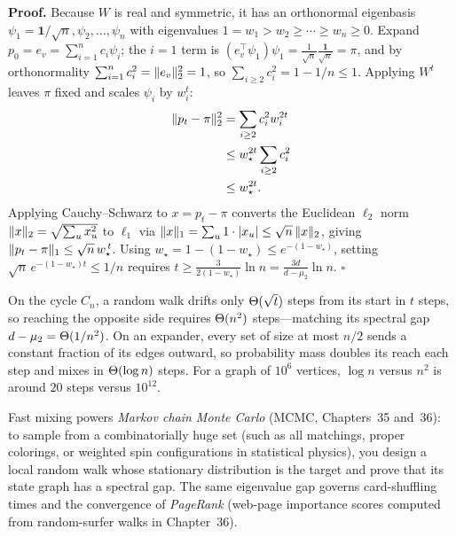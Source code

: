 \begin{whybox}
\textbf{Proof.} Because $W$ is real and symmetric, it has an orthonormal eigenbasis $\psi_1=\mathbf{1}/\sqrt{n},\psi_2,\dots,\psi_n$ with eigenvalues $1=w_1 > w_2 \ge \cdots \ge w_n \ge 0$. Expand $p_0 = e_v = \sum_{i=1}^n c_i\psi_i$; the $i=1$ term is $(e_v^\top \psi_1)\psi_1 = \frac{1}{\sqrt{n}}\frac{\mathbf{1}}{\sqrt{n}} = \pi$, and by orthonormality $\sum_{i=1}^n c_i^2 = \lVert e_v\rVert_2^2 = 1$, so $\sum_{i\ge 2} c_i^2 = 1 - 1/n \le 1$. Applying $W^t$ leaves $\pi$ fixed and scales $\psi_i$ by $w_i^t$:
\begin{align*}
  \lVert p_t-\pi\rVert_2^2 &= \sum_{i\ge 2} c_i^2 w_i^{2t} \\
                     &\le w_\star^{2t}\sum_{i\ge 2} c_i^2 \\
                     &\le w_\star^{2t}.
\end{align*}
Applying Cauchy--Schwarz to $x = p_t-\pi$ converts the Euclidean $\ell_2$ norm $\lVert x\rVert_2=\sqrt{\sum_u x_u^2}$ to $\ell_1$ via $\lVert x\rVert_1 = \sum_u 1\cdot\lvert x_u\rvert \le \sqrt{n}\,\lVert x\rVert_2$, giving $\lVert p_t-\pi\rVert_1\le\sqrt{n}\,w_\star^{\,t}$. Using $w_\star = 1-(1-w_\star)\le e^{-(1-w_\star)}$, setting $\sqrt{n}\,e^{-(1-w_\star)t}\le 1/n$ requires $t \ge \frac{3}{2(1-w_\star)}\ln n = \frac{3d}{d-\mu_2}\ln n$. \hfill$\square$
\end{whybox}

\begin{intuitionbox}
On the cycle $C_n$, a random walk drifts only $\Theta(\sqrt{t})$ steps from its start in $t$ steps, so reaching the opposite side requires $\Theta(n^2)$ steps---matching its spectral gap $d-\mu_2 = \Theta(1/n^2)$. On an expander, every set of size at most $n/2$ sends a constant fraction of its edges outward, so probability mass doubles its reach each step and mixes in $\Theta(\log n)$ steps. For a graph of $10^6$ vertices, $\log n$ versus $n^2$ is around $20$ steps versus $10^{12}$.
\end{intuitionbox}

\begin{applicationbox}
Fast mixing powers \emph{Markov chain Monte Carlo} (MCMC, Chapters~35 and~36): to sample from a combinatorially huge set (such as all matchings, proper colorings, or weighted spin configurations in statistical physics), you design a local random walk whose stationary distribution is the target and prove that its state graph has a spectral gap. The same eigenvalue gap governs card-shuffling times and the convergence of \emph{PageRank} (web-page importance scores computed from random-surfer walks in Chapter~36).
\end{applicationbox}

